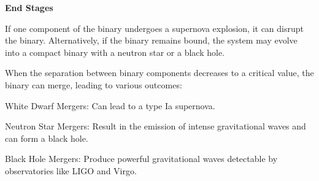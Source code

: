\textbf{End Stages}


If one component of the binary undergoes a supernova explosion, it can disrupt the binary. Alternatively, if the binary remains bound, the system may evolve into a compact binary with a neutron star or a black hole.


When the separation between binary components decreases to a critical value, the binary can merge, leading to various outcomes:

    White Dwarf Mergers: Can lead to a type Ia supernova.

    Neutron Star Mergers: Result in the emission of intense gravitational waves and can form a black hole.

    Black Hole Mergers: Produce powerful gravitational waves detectable by observatories like LIGO and Virgo.





